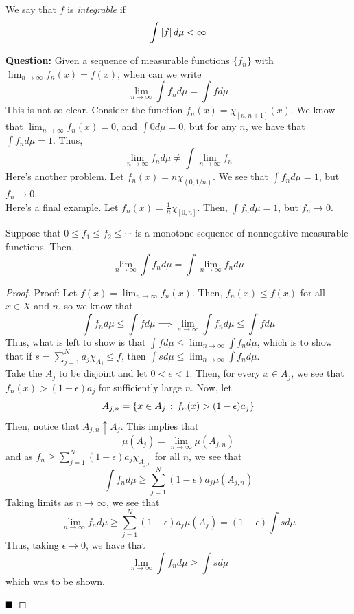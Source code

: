 
\begin{definition}
    We say that $f$ is \emph{integrable} if
    \[ \int \left\lvert {f} \right\rvert d\mu < \infty \]
\end{definition}

\textbf{Question:} Given a sequence of measurable functions $\{f_n\}$ with $\lim_{n \to \infty} f_{n}(x) = f(x)$, when can we write
\[ \lim_{n \to \infty} \int f_n d\mu = \int f d\mu \]
This is not so clear. Consider the function $f_n(x) = \chi_{[n, n + 1]}(x)$. We know that $\lim_{n \to \infty} f_n(x) = 0$, and $\int 0 d\mu = 0$, but for any $n$, we have that $\int f_n d\mu = 1$. Thus, 
\[ \lim_{n \to \infty} f_n d\mu \ne \int \lim_{n \to \infty} f_n \]
Here's another problem. Let $f_{n}(x) = n\chi_{(0, 1/n)}$. We see that $\int f_{n} d\mu = 1$, but $f_n \to 0$.\\

Here's a final example. Let $f_{n}(x) = \frac{1}{n}\chi_{[0, n]}$. Then, $\int f_n d\mu = 1$, but $f_n \to 0$. 

\begin{theorem}
    Suppose that $0 \leq f_1 \leq f_2 \leq \cdots$ is a monotone sequence of nonnegative measurable functions. Then, 
    \[ \lim_{n \to \infty} \int f_n d\mu = \int \lim_{n \to \infty} f_n d\mu \]
\end{theorem}
\begin{proof}{Proof:}
    Let $f(x) = \lim_{n \to \infty} f_n(x)$. Then, $f_{n}(x) \leq f(x)$ for all $x \in X$ and $n$, so we know that
    \[ \int f_n d\mu \leq \int f d\mu \implies \lim_{n \to \infty} \int f_n d\mu \leq \int f d\mu \]
    Thus, what is left to show is that $\int f d\mu \leq \lim_{n \to \infty} \int f_n d\mu$, which is to show that if $s = \sum_{j = 1}^{N} a_j\chi_{A_j} \leq f$, then $\int s d\mu \leq \lim_{n \to \infty} \int f_n d\mu$.\\

    Take the $A_j$ to be disjoint and let $0 < \epsilon < 1$. Then, for every $x \in A_j$, we see that $f_{n}(x) > (1 - \epsilon)a_j$ for sufficiently large $n$. Now, let
    \[ A_{j, n} = \{x \in A_j \, :\, f_{n}(x) > (1 - \epsilon)a_j\} \]
    Then, notice that $A_{j, n} \uparrow A_{j}$. This implies that
    \[ \mu(A_j) = \lim_{n \to \infty} \mu(A_{j, n}) \]
    and as $f_n \geq \sum_{j = 1}^{N} (1 - \epsilon)a_j\chi_{A_{j, n}}$ for all $n$,  we see that
    \[ \int f_n d\mu \geq \sum_{j = 1}^{N} (1 - \epsilon)a_j\mu(A_{j, n}) \]
    Taking limits as $n \to \infty$, we see that
    \[ \lim_{n \to \infty} f_n d\mu \geq \sum_{j = 1}^{N} (1 - \epsilon)a_j\mu(A_j) = (1 - \epsilon)\int s d\mu \]
    Thus, taking $\epsilon \to 0$, we have that
    \[ \lim_{n \to \infty} \int f_n d\mu \geq \int s d\mu \]
    which was to be shown.

    $\qed$
\end{proof}

